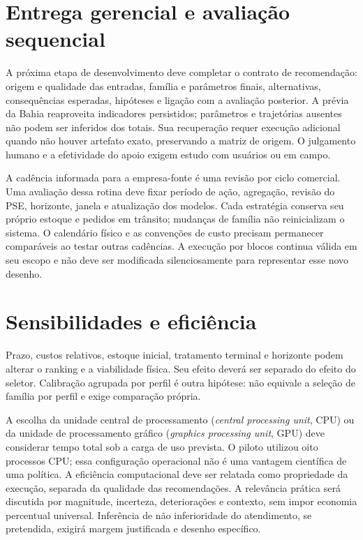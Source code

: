 \section{Entrega gerencial e avaliação sequencial}
A próxima etapa de desenvolvimento deve completar o contrato de recomendação: origem e qualidade das entradas, família e parâmetros finais, alternativas, consequências esperadas, hipóteses e ligação com a avaliação posterior. A prévia da Bahia reaproveita indicadores persistidos; parâmetros e trajetórias ausentes não podem ser inferidos dos totais. Sua recuperação requer execução adicional quando não houver artefato exato, preservando a matriz de origem. O julgamento humano e a efetividade do apoio exigem estudo com usuários ou em campo.

A cadência informada para a empresa-fonte é uma revisão por ciclo comercial. Uma avaliação dessa rotina deve fixar período de ação, agregação, revisão do PSE, horizonte, janela e atualização dos modelos. Cada estratégia conserva seu próprio estoque e pedidos em trânsito; mudanças de família não reinicializam o sistema. O calendário físico e as convenções de custo precisam permanecer comparáveis ao testar outras cadências. A execução por blocos continua válida em seu escopo e não deve ser modificada silenciosamente para representar esse novo desenho.

\section{Sensibilidades e eficiência}
\label{sec:robustez_pooling}
Prazo, custos relativos, estoque inicial, tratamento terminal e horizonte podem alterar o ranking e a viabilidade física. Seu efeito deverá ser separado do efeito do seletor. Calibração agrupada por perfil é outra hipótese: não equivale a seleção de família por perfil e exige comparação própria.

A escolha da unidade central de processamento (\textit{central processing unit}, CPU) ou da unidade de processamento gráfico (\textit{graphics processing unit}, GPU) deve considerar tempo total sob a carga de uso prevista. O piloto utilizou oito processos CPU; essa configuração operacional não é uma vantagem científica de uma política. A eficiência computacional deve ser relatada como propriedade da execução, separada da qualidade das recomendações. A relevância prática será discutida por magnitude, incerteza, deteriorações e contexto, sem impor economia percentual universal. Inferência de não inferioridade do atendimento, se pretendida, exigirá margem justificada e desenho específico.


